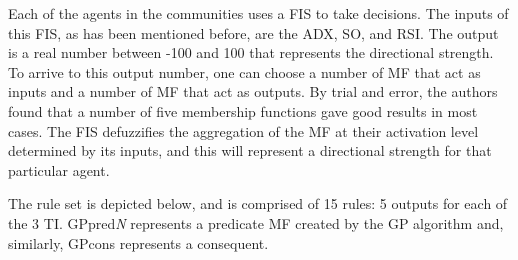 \documentclass[a4paper,twoside]{article}
\begin{document}


Each of the agents in the communities uses a FIS to take
decisions. The inputs of this FIS, as has been mentioned before, are
the ADX, SO, and RSI. The output is a real number between -100 and 100
that represents the directional strength. To arrive to this output
number, one can choose a number of MF that act as inputs and a number
of MF that act as outputs. By trial and error, the authors found that
a number of five membership functions gave good results in most cases. %
The FIS
defuzzifies the aggregation of the MF at their activation level
determined by its inputs, and this will represent a directional
strength for that particular agent. 

The rule set is depicted below, and is comprised of 15 rules: 5
outputs for each of the 3 TI. GPpred\textit{N} represents a predicate
MF created by the GP algorithm and, similarly, GPcons
represents a consequent. 
\end{document}
